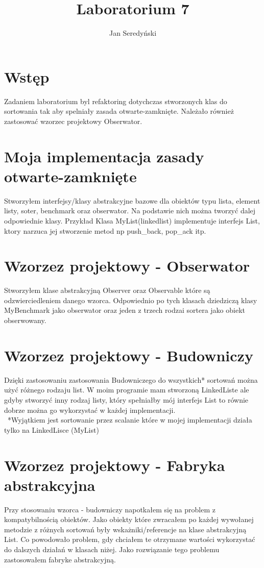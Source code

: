 \documentclass[11pt]{article}
\begin{document}
\title{Laboratorium 7}
\author{Jan Seredyński}
\maketitle

\section{Wstęp}
Zadaniem laboratorium byl refaktoring dotychczas stworzonych klas do sortowania tak aby spelniały zasada otwarte-zamknięte. Należało również zastosować wzorzec projektowy Obserwator. 


\section{Moja implementacja zasady otwarte-zamknięte}
Stworzyłem interfejsy/klasy abstrakcyjne bazowe dla obiektów typu lista, element listy, soter, benchmark oraz obserwator. Na podstawie nich można tworzyć dalej odpowiednie klasy. 
Przykład
Klasa MyList(linkedlist) implementuje interfejs List, ktory narzuca jej stworzenie
 metod np push\_back, pop\_ack itp.


\section{Wzorzez projektowy - Obserwator}
Stworzyłem klase abstrakcyjną Observer oraz Observable które są odzwierciedleniem danego wzorca. Odpowiednio po tych klasach dziedziczą klasy MyBenchmark jako obserwator oraz jeden z trzech rodzai sortera jako obiekt obserwowany.

\section{Wzorzez projektowy - Budowniczy}
Dzięki zastosowaniu zastosowania Budowniczego do wszystkich* sortowań można użyć różnego rodzaju list. W moim programie mam stworzoną LinkedListe ale gdyby stworzyć inny rodzaj listy, który spełniałby mój interfejs List to równie dobrze można go wykorzystać w każdej implementacji.\\\
*Wyjątkiem jest sortowanie przez scalanie które w mojej implementacji działa tylko na LinkedLisce (MyList)

\section{Wzorzez projektowy - Fabryka abstrakcyjna}
Przy stosowaniu wzorca - budowniczy napotkałem się na problem z kompatybilnością obiektów. Jako obiekty które zwracałem po każdej wywołanej metodzie z różnych sortowań były wskażniki/referencje na klase abstrakcyjną List. Co powodowało problem, gdy chciałem te otrzymane wartości wykorzystać do dalszych działań w klasach niżej. Jako rozwiązanie tego problemu zastosowałem fabryke abstrakcyjną.
\end{document}
